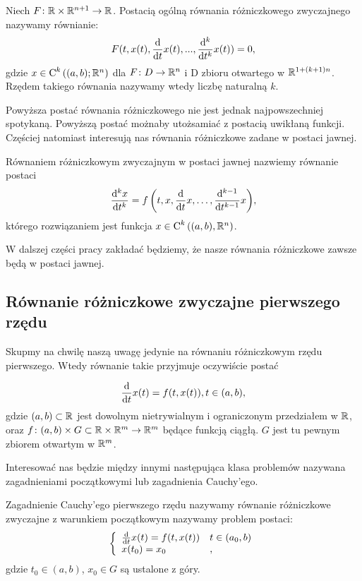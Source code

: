 \documentclass[12pt,a4paper]{report}
\begin{document}
\begin{definition}
Niech $F \colon \setR \times \setR^{n+1} \to \setR$. Postacią ogólną równania różniczkowego zwyczajnego nazywamy równianie: 
\begin{equation*}
F(t, x(t), \ddx{t} x(t),..., \ddx[^k]{t^k} x(t) ) = 0,
\end{equation*}
gdzie $x \in \Ck{k}{(a,b); \setR^n}$ dla $F \colon D \to \setR^n$ i D zbioru otwartego w $\setR^{1+(k+1)n}$. 
Rzędem takiego równania nazywamy wtedy liczbę naturalną $k$. 
\end{definition}

Powyższa postać równania różniczkowego nie jest jednak najpowszechniej spotykaną. Powyższą postać możnaby utożsamiać z postacią uwikłaną funkcji. Częściej natomiast interesują nas równania różniczkowe zadane w postaci jawnej.

\begin{definition}
Równaniem różniczkowym zwyczajnym w postaci jawnej nazwiemy równanie postaci
$$
\ddx[{^k x}]{t^k} = \function{f}{t,x,\ddx{t}x, \ldots, \ddx[{^{k-1}}]{t^{k-1}} x},
$$
którego rozwiązaniem jest funkcja $x \in \Ck{k}{(a,b), \setR^n}$.
\end{definition}


W dalszej części pracy zakładać będziemy, że nasze równania różniczkowe zawsze będą w postaci jawnej.


\subsection{Równanie różniczkowe zwyczajne pierwszego rzędu}

Skupmy na chwilę naszą uwagę jedynie na równaniu różniczkowym rzędu pierwszego. Wtedy równanie takie przyjmuje oczywiście postać 

$$
\ddx{t}x(t) = f(t,x(t)), t \in (a,b) ,
$$ 
gdzie $(a,b) \subset \setR$ jest dowolnym nietrywialnym i ograniczonym przedziałem w $\setR$, oraz $ f \colon (a,b) \times G \subset \setR \times \setR^m \to \setR^m$ będące funkcją ciągłą. $G$ jest tu pewnym zbiorem otwartym w $\setR^m$. 

Interesować nas będzie między innymi następująca klasa problemów nazywana zagadnieniami początkowymi lub zagadnienia Cauchy'ego.

\begin{problem} \label{prob-zagadnienie-cauchy}
Zagadnienie Cauchy'ego pierwszego rzędu nazywamy równanie różniczkowe zwyczajne z warunkiem początkowym nazywamy problem postaci:
\begin{equation} 
\left\{\begin{array}{ll}
\ddx{t} x(t) = f(t,x(t)) & t \in (a_0,b) \\
x(t_0) = x_0 &,
\end{array} \right.
\end{equation}
gdzie $t_0 \in (a,b)$, $x_0 \in G$ są ustalone z góry. 
\end{problem}
\end{document}
